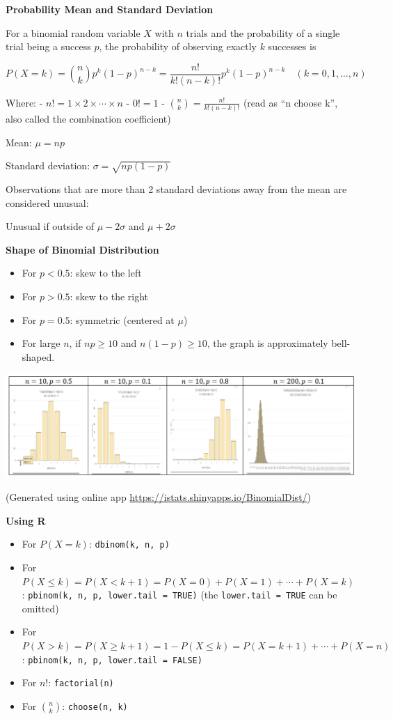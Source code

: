 \documentclass[
]{book}
\providecommand{\tightlist}{%
  \setlength{\itemsep}{0pt}\setlength{\parskip}{0pt}}
\begin{document}
\textbf{Probability Mean and Standard Deviation}

For a binomial random variable \(X\) with \(n\) trials and the probability of a single trial being a success \(p\), the probability of observing exactly \(k\) successes is

\[
P(X = k) = \binom{n}{k} p^k (1-p)^{n-k} = \frac{n!}{k!(n-k)!} p^k (1-p)^{n-k} \quad (k = 0, 1, \ldots, n)
\]

Where: - \(n! = 1 \times 2 \times \cdots \times n\) - \(0! = 1\) - \(\binom{n}{k} = \frac{n!}{k!(n-k)!}\) (read as ``n choose k'', also called the combination coefficient)

Mean: \(\mu = np\)

Standard deviation: \(\sigma = \sqrt{np(1-p)}\)

Observations that are more than 2 standard deviations away from the mean are considered unusual:

Unusual if outside of \(\mu - 2\sigma\) and \(\mu + 2\sigma\)

\textbf{Shape of Binomial Distribution}

\begin{itemize}
\tightlist
\item
  For \(p < 0.5\): skew to the left
\item
  For \(p > 0.5\): skew to the right
\item
  For \(p = 0.5\): symmetric (centered at \(\mu\))
\item
  For large \(n\), if \(np \geq 10\) and \(n(1-p) \geq 10\), the graph is approximately bell-shaped.
\end{itemize}

\includegraphics[width=5.72917in,height=\textheight]{images/img41.png}

(Generated using online app \url{https://istats.shinyapps.io/BinomialDist/})

\textbf{Using R}

\begin{itemize}
\item
  For \(P(X = k)\): \texttt{dbinom(k,\ n,\ p)}
\item
  For \(P(X \leq k) = P(X < k+1) = P(X = 0) + P(X = 1) + \cdots + P(X = k)\): \texttt{pbinom(k,\ n,\ p,\ lower.tail\ =\ TRUE)} (the \texttt{lower.tail\ =\ TRUE} can be omitted)
\item
  For \(P(X > k) = P(X \geq k+1) = 1 - P(X \leq k) = P(X = k+1) + \cdots + P(X = n)\): \texttt{pbinom(k,\ n,\ p,\ lower.tail\ =\ FALSE)}
\item
  For \(n!\): \texttt{factorial(n)}
\item
  For \(\binom{n}{k}\): \texttt{choose(n,\ k)}
\end{itemize}
\end{document}
